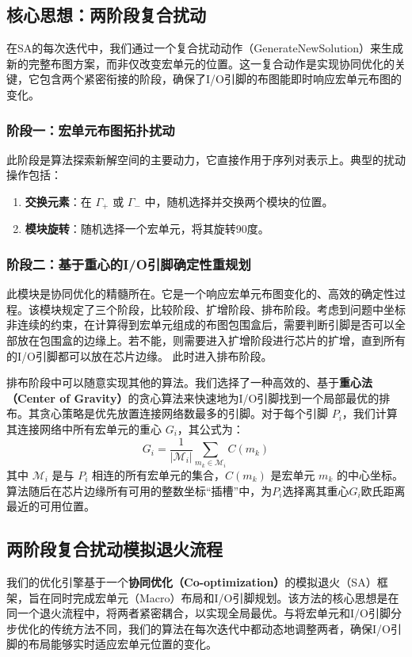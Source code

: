 \documentclass[conference]{IEEEtran}
\begin{document}
\subsection{核心思想：两阶段复合扰动}
在SA的每次迭代中，我们通过一个复合扰动动作（GenerateNewSolution）来生成新的完整布图方案，而非仅改变宏单元的位置。这一复合动作是实现协同优化的关键，它包含两个紧密衔接的阶段，确保了I/O引脚的布图能即时响应宏单元布图的变化。

\subsubsection{阶段一：宏单元布图拓扑扰动}
此阶段是算法探索新解空间的主要动力，它直接作用于序列对表示上。典型的扰动操作包括：
\begin{enumerate}
    \item \textbf{交换元素}：在 $\Gamma_+$ 或 $\Gamma_-$ 中，随机选择并交换两个模块的位置。
    \item \textbf{模块旋转}：随机选择一个宏单元，将其旋转90度。
\end{enumerate}

\subsubsection{阶段二：基于重心的I/O引脚确定性重规划}
此模块是协同优化的精髓所在。它是一个响应宏单元布图变化的、高效的确定性过程。该模块规定了三个阶段，比较阶段、扩增阶段、排布阶段。考虑到问题中坐标非连续的约束，在计算得到宏单元组成的布图包围盒后，需要判断引脚是否可以全部放在包围盒的边缘上。若不能，则需要进入扩增阶段进行芯片的扩增，直到所有的I/O引脚都可以放在芯片边缘。
此时进入排布阶段。

排布阶段中可以随意实现其他的算法。我们选择了一种高效的、基于\textbf{重心法（Center of Gravity）}的贪心算法来快速地为I/O引脚找到一个局部最优的排布。其贪心策略是优先放置连接网络数最多的引脚。对于每个引脚 $P_i$，我们计算其连接网络中所有宏单元的重心 $G_i$，其公式为：
\begin{equation}
    G_i = \frac{1}{|\mathcal{M}_i|} \sum_{m_k \in \mathcal{M}_i} C(m_k)
\end{equation}
其中 $\mathcal{M}_i$ 是与 $P_i$ 相连的所有宏单元的集合，$C(m_k)$ 是宏单元 $m_k$ 的中心坐标。算法随后在芯片边缘所有可用的整数坐标“插槽”中，为$P_i$选择离其重心$G_i$欧氏距离最近的可用位置。

\subsection{两阶段复合扰动模拟退火流程}
我们的优化引擎基于一个\textbf{协同优化（Co-optimization）}的模拟退火（SA）框架，旨在同时完成宏单元（Macro）布局和I/O引脚规划。该方法的核心思想是在同一个退火流程中，将两者紧密耦合，以实现全局最优。与将宏单元和I/O引脚分步优化的传统方法不同，我们的算法在每次迭代中都动态地调整两者，确保I/O引脚的布局能够实时适应宏单元位置的变化。
\end{document}
